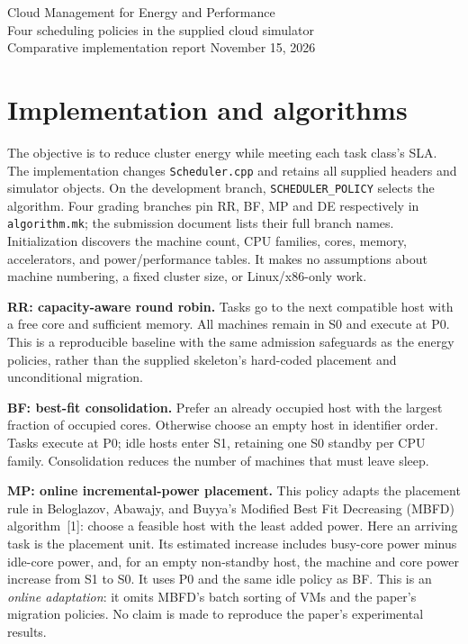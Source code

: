 \documentclass[10pt,letterpaper]{article}
\begin{document}
\begin{center}
{\Large Cloud Management for Energy and Performance}\\[4pt]
{\large Four scheduling policies in the supplied cloud simulator}\\[3pt]
Comparative implementation report \quad November 15, 2026
\end{center}

\section*{Implementation and algorithms}
The objective is to reduce cluster energy while meeting each task class's SLA.
The implementation changes \texttt{Scheduler.cpp} and retains all supplied
headers and simulator objects. On the development branch, \texttt{SCHEDULER\_POLICY} selects the algorithm.
Four grading branches pin RR, BF, MP and DE respectively in \texttt{algorithm.mk};
the submission document lists their full branch names. Initialization discovers the machine count, CPU families,
cores, memory, accelerators, and power/performance tables. It makes no assumptions
about machine numbering, a fixed cluster size, or Linux/x86-only work.

\textbf{RR: capacity-aware round robin.} Tasks go to the next compatible host
with a free core and sufficient memory. All machines remain in S0 and execute at
P0. This is a reproducible baseline with the same admission safeguards as the
energy policies, rather than the supplied skeleton's hard-coded placement and
unconditional migration.

\textbf{BF: best-fit consolidation.} Prefer an already occupied host with the
largest fraction of occupied cores. Otherwise choose an empty host in identifier
order. Tasks execute at P0; idle hosts enter S1, retaining one S0 standby per CPU
family. Consolidation reduces the number of machines that must leave sleep.

\textbf{MP: online incremental-power placement.} This policy adapts the placement
rule in Beloglazov, Abawajy, and Buyya's Modified Best Fit Decreasing (MBFD)
algorithm~[1]: choose a feasible host with the least added power. Here an arriving
task is the placement unit. Its estimated increase includes busy-core power minus
idle-core power, and, for an empty non-standby host, the machine and core power
increase from S1 to S0. It uses P0 and the same idle policy as BF. This is an
\emph{online adaptation}: it omits MBFD's batch sorting of VMs and the paper's
migration policies. No claim is made to reproduce the paper's experimental results.
\end{document}
